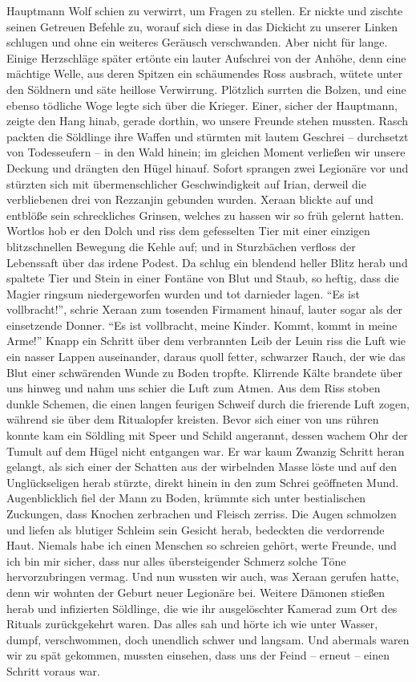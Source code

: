 Hauptmann Wolf schien zu verwirrt, um Fragen zu stellen. Er nickte und zischte seinen Getreuen Befehle zu, worauf sich diese in das Dickicht zu unserer Linken schlugen und ohne ein weiteres Geräusch verschwanden. Aber nicht für lange. Einige Herzschläge später ertönte ein lauter Aufschrei von der Anhöhe, denn eine mächtige Welle, aus deren Spitzen ein schäumendes Ross ausbrach, wütete unter den Söldnern und säte heillose Verwirrung. Plötzlich surrten die Bolzen, und eine ebenso tödliche Woge legte sich über die Krieger. Einer, sicher der Hauptmann, zeigte den Hang hinab, gerade dorthin, wo unsere Freunde stehen mussten. Rasch packten die Söldlinge ihre Waffen und stürmten mit lautem Geschrei -- durchsetzt von Todesseufern -- in den Wald hinein; im gleichen Moment verließen wir unsere Deckung und drängten den Hügel hinauf. Sofort sprangen zwei Legionäre vor und stürzten sich mit übermenschlicher Geschwindigkeit auf Irian, derweil die verbliebenen drei von Rezzanjin gebunden wurden. Xeraan blickte auf und entblöße sein schreckliches Grinsen, welches zu hassen wir so früh gelernt hatten. Wortlos hob er den Dolch und riss dem gefesselten Tier mit einer einzigen blitzschnellen Bewegung die Kehle auf; und in Sturzbächen verfloss der Lebenssaft über das irdene Podest. Da schlug ein blendend heller Blitz herab und spaltete Tier und Stein in einer Fontäne von Blut und Staub, so heftig, dass die Magier ringsum niedergeworfen wurden und tot darnieder lagen. ``Es ist vollbracht!'', schrie Xeraan zum tosenden Firmament hinauf, lauter sogar als der einsetzende Donner. ``Es ist vollbracht, meine Kinder. Kommt, kommt in meine Arme!'' Knapp ein Schritt über dem verbrannten Leib der Leuin riss die Luft wie ein nasser Lappen auseinander, daraus quoll fetter, schwarzer Rauch, der wie das Blut einer schwärenden Wunde zu Boden tropfte. Klirrende Kälte brandete über uns hinweg und nahm uns schier die Luft zum Atmen. Aus dem Riss stoben dunkle Schemen, die einen langen feurigen Schweif durch die frierende Luft zogen, während sie über dem Ritualopfer kreisten. Bevor sich einer von uns rühren konnte kam ein Söldling mit Speer und Schild angerannt, dessen wachem Ohr der Tumult auf dem Hügel nicht entgangen war. Er war kaum Zwanzig Schritt heran gelangt, als sich einer der Schatten aus der wirbelnden Masse löste und auf den Unglückseligen herab stürzte, direkt hinein in den zum Schrei geöffneten Mund. Augenblicklich fiel der Mann zu Boden, krümmte sich unter bestialischen Zuckungen, dass Knochen zerbrachen und Fleisch zerriss. Die Augen schmolzen und liefen als blutiger Schleim sein Gesicht herab, bedeckten die verdorrende Haut. Niemals habe ich einen Menschen so schreien gehört, werte Freunde, und ich bin mir sicher, dass nur alles übersteigender Schmerz solche Töne hervorzubringen vermag. Und nun wussten wir auch, was Xeraan gerufen hatte, denn wir wohnten der Geburt neuer Legionäre bei. Weitere Dämonen stießen herab und infizierten Söldlinge, die wie ihr ausgelöschter Kamerad zum Ort des Rituals zurückgekehrt waren. Das alles sah und hörte ich wie unter Wasser, dumpf, verschwommen, doch unendlich schwer und langsam. Und abermals waren wir zu spät gekommen, mussten einsehen, dass uns der Feind -- erneut -- einen Schritt voraus war.

